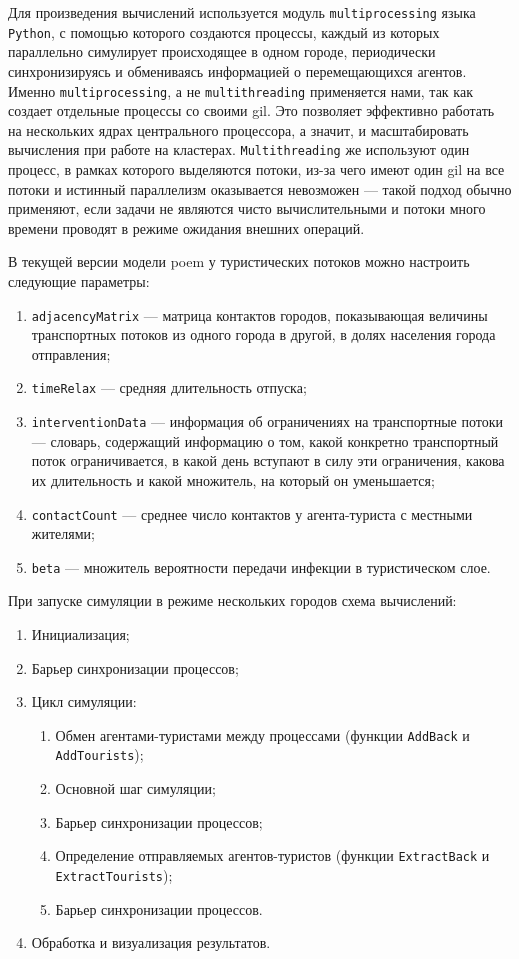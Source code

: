 \documentclass[a4paper,12pt]{article} %
\begin{document}
Для произведения вычислений используется модуль \texttt{multiprocessing} языка \texttt{Python}, с помощью которого создаются процессы, каждый из которых параллельно симулирует происходящее в одном городе, периодически синхронизируясь и обмениваясь информацией о перемещающихся агентов. Именно \texttt{multiprocessing}, а не \texttt{multithreading} применяется нами, так как создает отдельные процессы со своими \gls{gil}. Это позволяет эффективно работать на нескольких ядрах центрального процессора, а значит, и масштабировать вычисления при работе на кластерах. \texttt{Multithreading} же используют один процесс, в рамках которого выделяются потоки, из-за чего имеют один \gls{gil} на все потоки и истинный параллелизм оказывается невозможен --- такой подход обычно применяют, если задачи не являются чисто вычислительными и потоки много времени проводят в режиме ожидания внешних операций.

В текущей версии модели \gls{poem} у туристических потоков можно настроить следующие параметры:

\begin{enumerate}
\item \texttt{adjacencyMatrix} --- матрица контактов городов, показывающая величины транспортных потоков из одного города в другой, в долях населения города отправления;
\item \texttt{timeRelax} --- средняя длительность отпуска;
\item \texttt{interventionData} --- информация об ограничениях на транспортные потоки --- словарь, содержащий информацию о том, какой конкретно транспортный поток ограничивается, в какой день вступают в силу эти ограничения, какова их длительность и какой множитель, на который он уменьшается;
\item \texttt{contactCount} --- среднее число контактов у агента-туриста с местными жителями;
\item \texttt{beta} --- множитель вероятности передачи инфекции в туристическом слое.
\end{enumerate}

При запуске симуляции в режиме нескольких городов схема вычислений:

\begin{enumerate}
	\item Инициализация;
	\item Барьер синхронизации процессов;
	\item Цикл симуляции:
	\begin{enumerate}
		\item Обмен агентами-туристами между процессами (функции \texttt{AddBack} и \texttt{AddTourists});
		\item Основной шаг симуляции;
		\item Барьер синхронизации процессов;
		\item Определение отправляемых агентов-туристов (функции \texttt{ExtractBack} и \texttt{ExtractTourists});
		\item Барьер синхронизации процессов.
	\end{enumerate}
	\item Обработка и визуализация результатов.
\end{enumerate}
\end{document}

